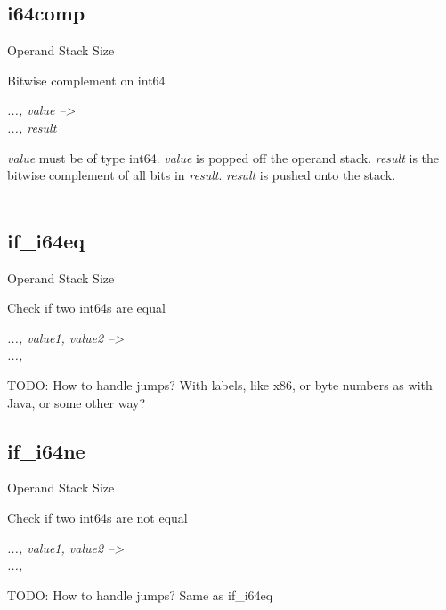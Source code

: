 \documentclass[12pt]{article}
\begin{document}
		\newpage
		\subsection*{i64comp}
			\begin{labeling}{Operand Stack Size}
				\item [\textbf{Operation}] Bitwise complement on int64
				\item [\textbf{Format}] 
				\item [\textbf{Operand Stack}] \textit{..., value --\textgreater} \\
										\textit{..., result}
				\item [\textbf{Description}] \textit{value} must be of type int64. \textit{value} is popped off the operand stack. \textit{result} is the bitwise complement of all bits in \textit{result}. \textit{result} is pushed onto the stack. \\ \\
				
			\end{labeling}	
			
		\newpage
		\subsection*{if\_i64eq}
			\begin{labeling}{Operand Stack Size}
				\item [\textbf{Operation}] Check if two int64s are equal 
				\item [\textbf{Format}] 
				\item [\textbf{Operand Stack}] \textit{..., value1, value2 --\textgreater} \\
										\textit{..., }
				\item [\textbf{Description}] TODO: How to handle jumps? With labels, like x86, or byte numbers as with Java, or some other way? 
			\end{labeling}	
			
		\newpage
		\subsection*{if\_i64ne}
			\begin{labeling}{Operand Stack Size}
				\item [\textbf{Operation}] Check if two int64s are not equal
				\item [\textbf{Format}] 
				\item [\textbf{Operand Stack}] \textit{..., value1, value2 --\textgreater} \\
										\textit{..., }
				\item [\textbf{Description}] TODO: How to handle jumps? Same as if\_i64eq
			\end{labeling}	
		\newpage
		
\end{document}
